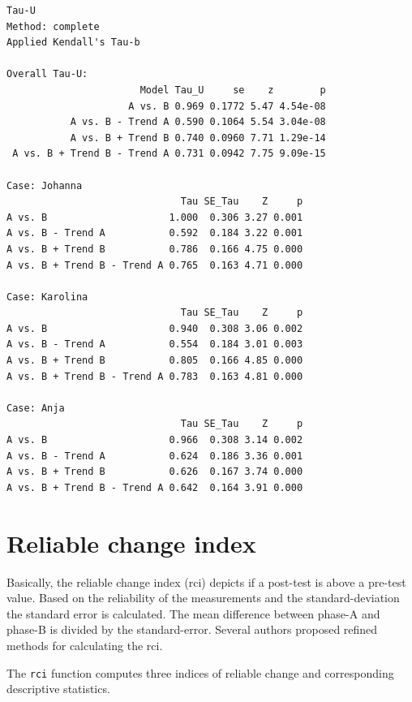 \documentclass[
]{book}
\newenvironment{Shaded}{\begin{snugshade}}{\end{snugshade}}
\newcommand{\AttributeTok}[1]{\textcolor[rgb]{0.77,0.63,0.00}{#1}}
\newcommand{\ConstantTok}[1]{\textcolor[rgb]{0.00,0.00,0.00}{#1}}
\newcommand{\FloatTok}[1]{\textcolor[rgb]{0.00,0.00,0.81}{#1}}
\newcommand{\FunctionTok}[1]{\textcolor[rgb]{0.00,0.00,0.00}{#1}}
\newcommand{\NormalTok}[1]{#1}
\newcommand{\SpecialCharTok}[1]{\textcolor[rgb]{0.00,0.00,0.00}{#1}}
\begin{document}
\begin{verbatim}
Tau-U
Method: complete 
Applied Kendall's Tau-b

Overall Tau-U: 
                       Model Tau_U     se    z        p
                     A vs. B 0.969 0.1772 5.47 4.54e-08
           A vs. B - Trend A 0.590 0.1064 5.54 3.04e-08
           A vs. B + Trend B 0.740 0.0960 7.71 1.29e-14
 A vs. B + Trend B - Trend A 0.731 0.0942 7.75 9.09e-15

Case: Johanna 
                              Tau SE_Tau    Z     p
A vs. B                     1.000  0.306 3.27 0.001
A vs. B - Trend A           0.592  0.184 3.22 0.001
A vs. B + Trend B           0.786  0.166 4.75 0.000
A vs. B + Trend B - Trend A 0.765  0.163 4.71 0.000

Case: Karolina 
                              Tau SE_Tau    Z     p
A vs. B                     0.940  0.308 3.06 0.002
A vs. B - Trend A           0.554  0.184 3.01 0.003
A vs. B + Trend B           0.805  0.166 4.85 0.000
A vs. B + Trend B - Trend A 0.783  0.163 4.81 0.000

Case: Anja 
                              Tau SE_Tau    Z     p
A vs. B                     0.966  0.308 3.14 0.002
A vs. B - Trend A           0.624  0.186 3.36 0.001
A vs. B + Trend B           0.626  0.167 3.74 0.000
A vs. B + Trend B - Trend A 0.642  0.164 3.91 0.000
\end{verbatim}

\hypertarget{reliable-change-index}{%
\section{Reliable change index}\label{reliable-change-index}}

Basically, the reliable change index (rci) depicts if a post-test is above a pre-test value. Based on the reliability of the measurements and the standard-deviation the standard error is calculated. The mean difference between phase-A and phase-B is divided by the standard-error. Several authors proposed refined methods for calculating the rci.

The \texttt{rci} function computes three indices of reliable change \citep{wise_methods_2004} and corresponding descriptive statistics.

\begin{Shaded}
\end{Shaded}
\end{document}
